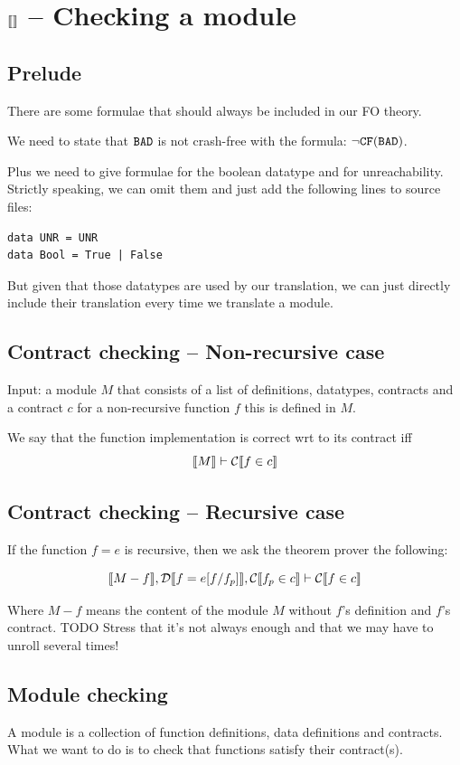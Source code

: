 \documentclass[preprint]{sigplanconf}
\begin{document}
\section{$\llbracket  \rrbracket$ -- Checking a module}

\subsection{Prelude}
There are some formulae that should always be included in our FO theory.

We need to state that $\texttt{BAD}$ is not crash-free with the formula:
$\lnot \texttt{CF}(\texttt{BAD})$.

Plus we need to give formulae for the boolean datatype and for
 unreachability. Strictly speaking, we can omit them and just add the
following lines to source files:
\begin{verbatim}
data UNR = UNR
data Bool = True | False
\end{verbatim}
But given that those datatypes are used by our translation, we can
just directly include their translation every time we translate a
module.

\subsection{Contract checking -- Non-recursive case}
Input: a module $M$ that consists of a list of definitions, datatypes,
contracts and a contract $c$ for a non-recursive function $f$ this is
defined in $M$.

We say that the function implementation is correct wrt to its contract
iff $$\llbracket M \rrbracket \vdash \mathcal{C} \llbracket f \in c \rrbracket$$

\subsection{Contract checking -- Recursive case}
If the function $f=e$ is recursive, then we ask the theorem prover the
following:

$$\llbracket M - f \rrbracket, \mathcal{D} \llbracket f=e[f/f_p] \rrbracket, \mathcal{C} \llbracket f_p \in c \rrbracket \vdash \mathcal{C} \llbracket f \in c \rrbracket$$

Where $M - f $ means the content of the module $M$ without $f$'s
definition and $f$'s contract. TODO Stress that it's not always enough
and that we may have to unroll several times!

\subsection{Module checking}
A module is a collection of function definitions, data definitions and
contracts. What we want to do is to check that functions satisfy their
contract(s). 
\end{document}

